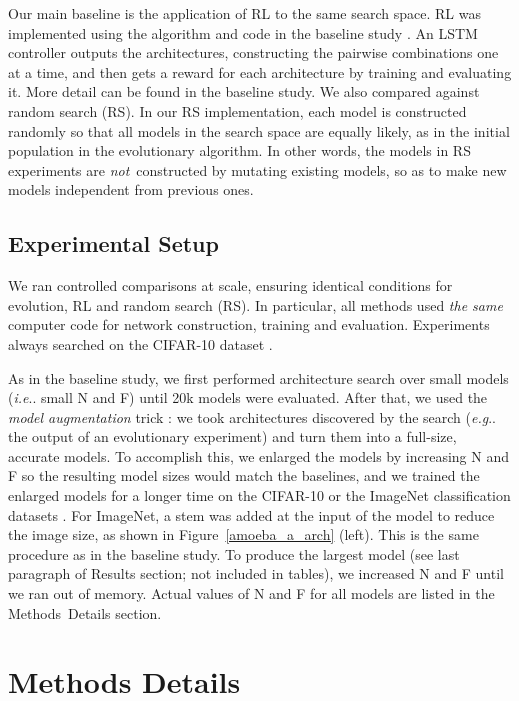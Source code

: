 \documentclass[letterpaper]{article} \usepackage{aaai19}  \usepackage{times}  \usepackage{helvet}  \usepackage{courier}  \usepackage{graphicx}  \frenchspacing
\makeatletter
\DeclareRobustCommand\onedot{\futurelet\@let@token\@onedot}
\def\@onedot{\ifx\@let@token.\else.\null\fi\xspace}
\def\eg{\emph{e.g}\onedot}
\def\ie{\emph{i.e}\onedot}
\makeatother
\begin{document}
Our main baseline is the application of RL to the same search space. RL was implemented using the algorithm and code in the baseline study \cite{zoph2017learning}. An LSTM controller outputs the architectures, constructing the pairwise combinations one at a time, and then gets a reward for each architecture by training and evaluating it. More detail can be found in the baseline study. We also compared against random search (RS). In our RS implementation, each model is constructed randomly so that all models in the search space are equally likely, as in the initial population in the evolutionary algorithm. In other words, the models in RS experiments are \mbox{\textit{not} constructed} by mutating existing models, so as to make new models independent from previous ones.


\subsection{Experimental Setup}


We ran controlled comparisons at scale, ensuring identical conditions for evolution, RL and random search (RS). In particular, all methods used \textit{the same} computer code for network construction, training and evaluation. Experiments always searched on the CIFAR-10 dataset \cite{krizhevsky2009learning}.

As in the baseline study, we first performed architecture search over small models (\ie small N and F) until 20k models were evaluated. After that, we used the \textit{model augmentation} trick \cite{zoph2017learning}: we took architectures discovered by the search (\eg the output of an evolutionary experiment) and turn them into a full-size, accurate models. To accomplish this, we enlarged the models by increasing N and F so the resulting model sizes would match the baselines, and we trained the enlarged models for a longer time on the CIFAR-10 or the ImageNet classification datasets \cite{krizhevsky2009learning,deng2009imagenet}. For ImageNet, a stem was added at the input of the model to reduce the image size, as shown in Figure~\ref{amoeba_a_arch} (left). This is the same procedure as in the baseline study. To produce the largest model (see last paragraph of Results section; not included in tables), we increased N and F until we ran out of memory. Actual values of N and F for all models are listed in the \mbox{Methods Details} section.


\section{Methods Details}
\end{document}
